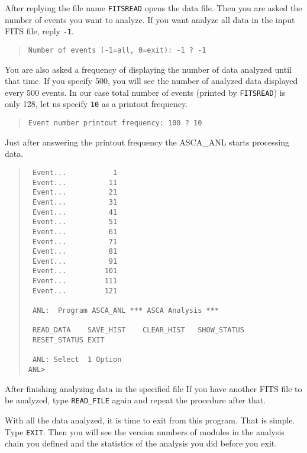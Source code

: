 After replying the file name
{\tt FITSREAD} opens the data file.
Then you are asked the number of events you want to analyze.
If you want analyze all data in the input FITS file,
reply {\tt -1}.

\begin{quote}\baselineskip 3.2mm\begin{verbatim}
Number of events (-1=all, 0=exit): -1 ? -1
\end{verbatim}\end{quote}

You are also asked a frequency of displaying the number of data
analyzed until that time.
If you specify 500,
you will see the number of analyzed data
displayed every 500 events.
In our case
total number of events (printed by {\tt FITSREAD}) is only 128,
let us specify {\tt 10} as a printout frequency.

\begin{quote}\baselineskip 3.2mm\begin{verbatim}
Event number printout frequency: 100 ? 10
\end{verbatim}\end{quote}

Just after answering the printout frequency
the ASCA\_ANL starts processing data.

\begin{quote}\baselineskip 3.2mm\begin{verbatim}
 Event...           1
 Event...          11
 Event...          21
 Event...          31
 Event...          41
 Event...          51
 Event...          61
 Event...          71
 Event...          81
 Event...          91
 Event...         101
 Event...         111
 Event...         121
 
 ANL:  Program ASCA_ANL *** ASCA Analysis ***
 
 READ_DATA    SAVE_HIST    CLEAR_HIST   SHOW_STATUS 
 RESET_STATUS EXIT        
 
 ANL: Select  1 Option
ANL> 
\end{verbatim}\end{quote}

After finishing analyzing data in the specified file
If you have another FITS file to be analyzed,
type {\tt READ\_FILE} again
and repeat the procedure after that.

With all the data analyzed,
it is time to exit from this program.
That is simple.
Type {\tt EXIT}.
Then you will see
the version numbers of modules in the analysis chain you defined
and the statistics of the analysis you did
before you exit.


